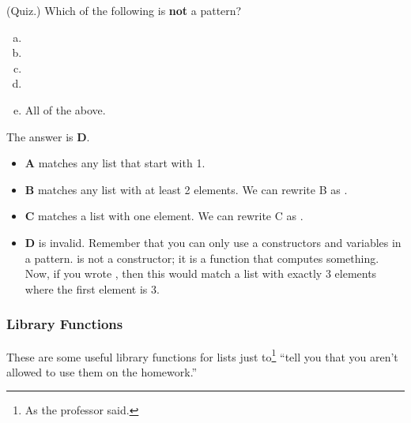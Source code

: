 \documentclass[letterpaper]{article}
\begin{document}
\begin{itemize}
    \begin{mdframed}[]
        (Quiz.) Which of the following is \textbf{not} a pattern? 
        \begin{enumerate}[(a)]
            \item {}
            \item \code{(\_:\_:\_)}
            \item \code{[x]}
            \item \code{[1+2,x,y]}
            \item All of the above.
        \end{enumerate}

        \begin{mdframed}[]
            The answer is \textbf{D}. 
            \begin{itemize}
                \item \textbf{A} matches any list that start with 1.
                \item \textbf{B} matches any list with at least 2 elements. We can rewrite B as . 
                \item \textbf{C} matches a list with one element. We can rewrite C as .
                \item \textbf{D} is invalid. Remember that you can only use a constructors and variables in a pattern. \code{+} is not a constructor; it is a function that computes something. Now, if you wrote \code{[3,x,y]}, then this would match a list with exactly 3 elements where the first element is 3. 
            \end{itemize}
        \end{mdframed}
    \end{mdframed}
\end{itemize}

\subsubsection{Library Functions}
These are some useful library functions for lists just to\footnote{As the professor said.} ``tell you that you aren't allowed to use them on the homework.''
\end{document}
